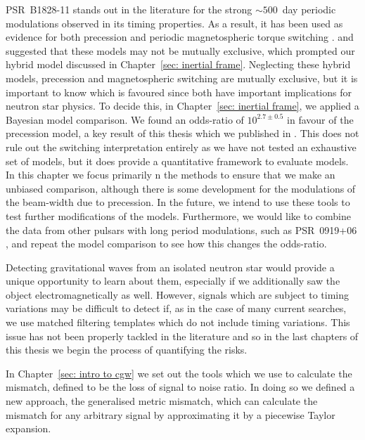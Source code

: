\documentclass[twoside, 11pt]{thesis}
\begin{document}
PSR~B1828-11 stands out in the literature for the strong $\sim 500$~day
periodic modulations observed in its timing properties. As a result, it has
been used as evidence for both precession \citep{Stairs2000} and periodic
magnetospheric torque switching \citep{Lyne2010}. \citet{Jones2001} and
\citet{Cordes2013} suggested that these models may not be mutually exclusive,
which prompted our hybrid model discussed in Chapter~\ref{sec: inertial frame}.
Neglecting these hybrid models, precession and magnetospheric
switching are mutually exclusive, but it is important to know which is favoured
since both have important implications for neutron star physics. To decide
this, in Chapter~\ref{sec: inertial frame}, we applied a Bayesian model
comparison. We found an odds-ratio of $10^{2.7\pm 0.5}$ in favour of the
precession model, a key result of this thesis which we published in
\citet{Ashton2016}. This does not rule out the switching interpretation
entirely as we have not tested an exhaustive set of models, but it does provide
a quantitative framework to evaluate models. In this chapter  we focus
primarily n the methods to ensure that we make an unbiased comparison, although
there is some development for the modulations of the beam-width due to
precession. In the future, we intend to use these tools to test further
modifications of the models. Furthermore, we would like to combine the data
from other pulsars with long period modulations, such as PSR~0919+06
\citep{Perera2014}, and repeat the model comparison to see how this changes the
odds-ratio.

Detecting gravitational waves from an isolated neutron star would provide a
unique opportunity to learn about them, especially if we additionally saw the
object electromagnetically as well. However, signals which are subject to
timing variations may be difficult to detect if, as in the case of many current
searches, we use matched filtering templates which do not include timing
variations. This issue has not been properly tackled in the literature and so
in the last chapters of this thesis we begin the process of quantifying the
risks.

In Chapter~\ref{sec: intro to cgw} we set out the tools which we use to
calculate the mismatch, defined to be the loss of signal to noise ratio. In
doing so we defined a new approach, the generalised metric mismatch, which can
calculate the mismatch for any arbitrary signal by approximating it by a
piecewise Taylor expansion.
\end{document}
